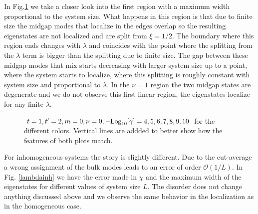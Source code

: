 \documentclass[twocolumn,amsmath,longbibliography,amssymb,superscriptaddress]{revtex4-1}
\begin{document}
In Fig.\ref{linearRegion} we take a closer look into the first region with a maximum width proportional to the system size. What happens in this region is that due to finite size the midgap modes that localize in the edges overlap so the resulting eigenstates are not localized and are split from $\xi = 1/2$. The boundary where this region ends changes with $\lambda$ and coincides with the point where the splitting from the $\lambda$ term is bigger than the splitting due to finite size. The gap between these midgap modes that mix starts decreasing with larger system size up to a point, where the system starts to localize, where this splitting is roughly constant with system size and proportional to $\lambda$. In the $\nu = 1$ region the two midgap states are degenerate and we do not observe this first linear region, the eigenstates localize for any finite $\lambda$.


\begin{figure}[h!]
\centering
{}
\caption{$t = 1, t'= 2, m=0, \nu=0 , -{\rm Log}_{10}[\gamma] = 4,5,6,7,8,9,10$ for the different colors. Vertical lines are addded to better show how the features of both plots match.}
\label{linearRegion}
\end{figure}



For inhomogeneous systems the story is slightly different. Due to the cut-average a wrong assignment of the bulk modes leads to an error of order $\mathcal{O}(1/L)$. In Fig. \ref{lambdainh} we have the error made in $\chi$ and the maximum width of the eigenstates for different values of system size $L$. The disorder does not change anything discussed above and we observe the same behavior in the localization as in the homogeneous case.
\end{document}
